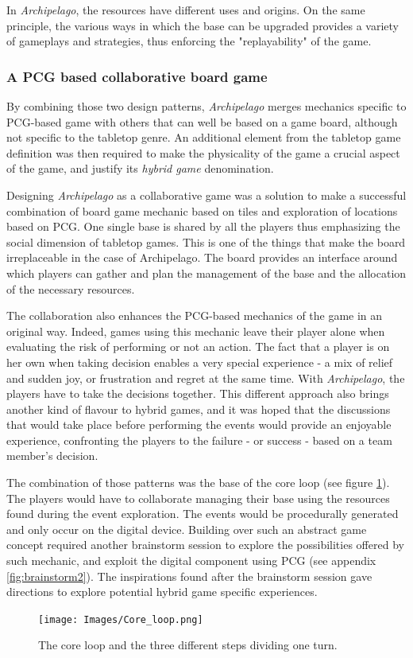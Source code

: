 In \textit{Archipelago}, the resources have different uses and origins. On the same principle, the various ways in which the base can be upgraded provides a variety of gameplays and strategies, thus enforcing the "replayability" of the game.
\subsubsection{A PCG based collaborative board game}
By combining those two design patterns, \textit{Archipelago} merges mechanics specific to PCG-based game with others that can well be based on a game board, although not specific to the tabletop genre. An additional element from the tabletop game definition was then required to make the physicality of the game a crucial aspect of the game, and justify its \textit{hybrid game} denomination.

Designing \textit{Archipelago} as a collaborative game was a solution to make a successful combination of board game mechanic based on tiles and exploration of locations based on PCG. One single base is shared by all the players thus emphasizing the social dimension of tabletop games. This is one of the things that make the board irreplaceable in the case of Archipelago. The board provides an interface around which players can gather and plan the management of the base and the allocation of the necessary resources.

The collaboration also enhances the PCG-based mechanics of the game in an original way. Indeed, games using this mechanic leave their player alone when evaluating the risk of performing or not an action. The fact that a player is on her own when taking decision enables a very special experience - a mix of relief and sudden joy, or frustration and regret at the same time. With \textit{Archipelago}, the players have to take the decisions together. This different approach also brings another kind of flavour to hybrid games, and it was hoped that the discussions that would take place before performing the events would provide an enjoyable experience, confronting the players to the failure - or success - based on a team member's decision.

The combination of those patterns was the base of the core loop (see figure \ref{fig:loop}). The players would have to collaborate managing their base using the resources found during the event exploration. The events would be procedurally generated and only occur on the digital device. Building over such an abstract game concept required another brainstorm session to explore the possibilities offered by such mechanic, and exploit the digital component using PCG (see appendix \ref{fig:brainstorm2}). The inspirations found after the brainstorm session gave directions to explore potential hybrid game specific experiences.
\begin{figure}[h]
    \centering
    \texttt{[image: Images/Core\_loop.png]}
    \caption{The core loop and the three different steps dividing one turn.}
    \label{fig:loop}
\end{figure}
